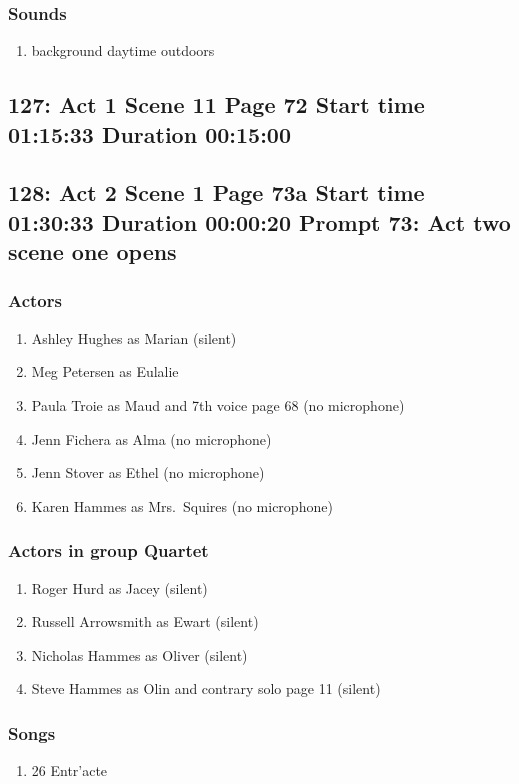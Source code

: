 \subsubsection{Sounds}
\begin{enumerate}
\item background daytime outdoors
\end{enumerate}
\subsection{127: Act 1 Scene 11 Page 72 Start time 01:15:33 Duration 00:15:00}

\subsection{128: Act 2 Scene 1 Page 73a Start time 01:30:33 Duration 00:00:20 Prompt 73: Act two scene one opens}

\subsubsection{Actors}
\begin{enumerate}
\item Ashley Hughes as Marian (silent)
\item Meg Petersen as Eulalie
\item Paula Troie as Maud and 7th voice page 68 (no microphone)
\item Jenn Fichera as Alma (no microphone)
\item Jenn Stover as Ethel (no microphone)
\item Karen Hammes as Mrs.~Squires (no microphone)
\end{enumerate}
\subsubsection{Actors in group Quartet}
\begin{enumerate}
\item Roger Hurd as Jacey (silent)
\item Russell Arrowsmith as Ewart (silent)
\item Nicholas Hammes as Oliver (silent)
\item Steve Hammes as Olin and contrary solo page 11 (silent)
\end{enumerate}

\subsubsection{Songs}
\begin{enumerate}
\item 26 Entr'acte
\end{enumerate}
